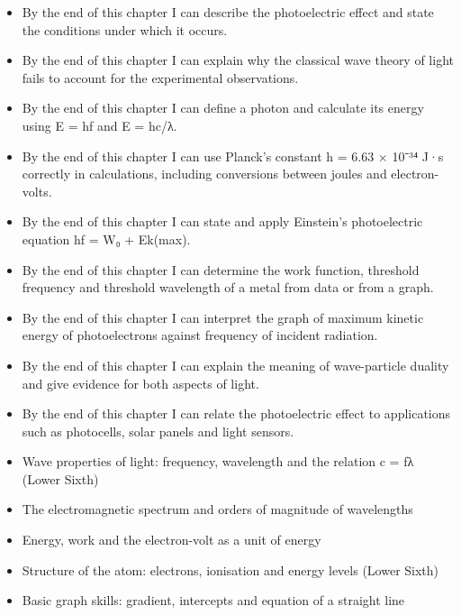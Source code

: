 \documentclass[11pt]{article}
\begin{document}
\begin{objectifs}
\begin{itemize}
\item By the end of this chapter I can describe the photoelectric effect and state the conditions under which it occurs.
\item By the end of this chapter I can explain why the classical wave theory of light fails to account for the experimental observations.
\item By the end of this chapter I can define a photon and calculate its energy using E = hf and E = hc/λ.
\item By the end of this chapter I can use Planck's constant h = 6.63 × 10⁻³⁴ J·s correctly in calculations, including conversions between joules and electron-volts.
\item By the end of this chapter I can state and apply Einstein's photoelectric equation hf = W₀ + Ek(max).
\item By the end of this chapter I can determine the work function, threshold frequency and threshold wavelength of a metal from data or from a graph.
\item By the end of this chapter I can interpret the graph of maximum kinetic energy of photoelectrons against frequency of incident radiation.
\item By the end of this chapter I can explain the meaning of wave-particle duality and give evidence for both aspects of light.
\item By the end of this chapter I can relate the photoelectric effect to applications such as photocells, solar panels and light sensors.
\end{itemize}
\end{objectifs}

\begin{prerequis}
\begin{itemize}
\item Wave properties of light: frequency, wavelength and the relation c = fλ (Lower Sixth)
\item The electromagnetic spectrum and orders of magnitude of wavelengths
\item Energy, work and the electron-volt as a unit of energy
\item Structure of the atom: electrons, ionisation and energy levels (Lower Sixth)
\item Basic graph skills: gradient, intercepts and equation of a straight line
\end{itemize}
\end{prerequis}
\end{document}
